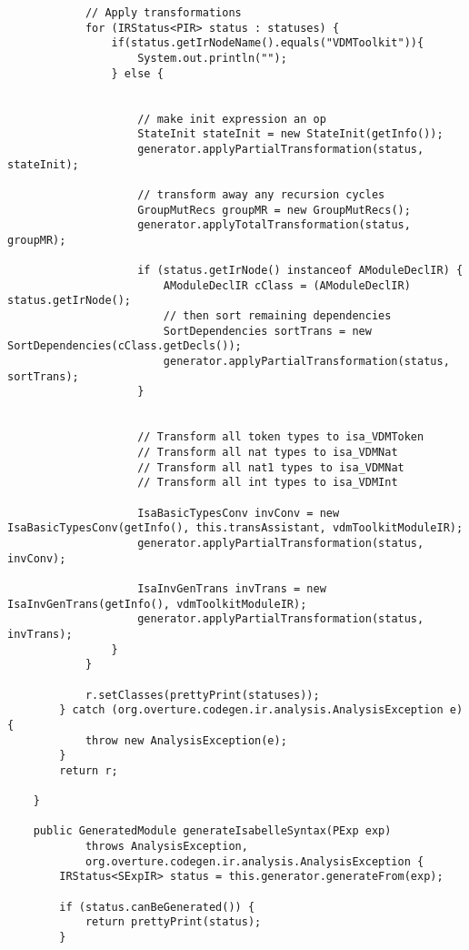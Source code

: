 \begin{appendices}
\begin{lstlisting}
            // Apply transformations
            for (IRStatus<PIR> status : statuses) {
                if(status.getIrNodeName().equals("VDMToolkit")){
                    System.out.println("");
                } else {


                    // make init expression an op
                    StateInit stateInit = new StateInit(getInfo());
                    generator.applyPartialTransformation(status, stateInit);

                    // transform away any recursion cycles
                    GroupMutRecs groupMR = new GroupMutRecs();
                    generator.applyTotalTransformation(status, groupMR);

                    if (status.getIrNode() instanceof AModuleDeclIR) {
                        AModuleDeclIR cClass = (AModuleDeclIR) status.getIrNode();
                        // then sort remaining dependencies
                        SortDependencies sortTrans = new SortDependencies(cClass.getDecls());
                        generator.applyPartialTransformation(status, sortTrans);
                    }

                    
                    // Transform all token types to isa_VDMToken
                    // Transform all nat types to isa_VDMNat
                    // Transform all nat1 types to isa_VDMNat
                    // Transform all int types to isa_VDMInt

                    IsaBasicTypesConv invConv = new IsaBasicTypesConv(getInfo(), this.transAssistant, vdmToolkitModuleIR);
                    generator.applyPartialTransformation(status, invConv);

                    IsaInvGenTrans invTrans = new IsaInvGenTrans(getInfo(), vdmToolkitModuleIR);
                    generator.applyPartialTransformation(status, invTrans);
                }
            }

            r.setClasses(prettyPrint(statuses));
        } catch (org.overture.codegen.ir.analysis.AnalysisException e) {
            throw new AnalysisException(e);
        }
        return r;

    }

    public GeneratedModule generateIsabelleSyntax(PExp exp)
            throws AnalysisException,
            org.overture.codegen.ir.analysis.AnalysisException {
        IRStatus<SExpIR> status = this.generator.generateFrom(exp);

        if (status.canBeGenerated()) {
            return prettyPrint(status);
        }


\end{lstlisting}
\end{appendices}
